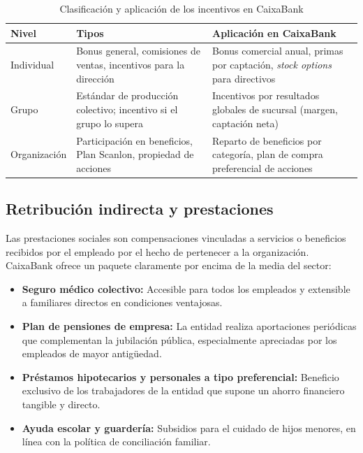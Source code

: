 \begin{table}[H]
\centering
\caption{Clasificación y aplicación de los incentivos en CaixaBank}
\label{tab:incentivos}
\small
\begin{tabularx}{\textwidth}{|l|X|X|}
\hline
\textbf{Nivel} & \textbf{Tipos} & \textbf{Aplicación en CaixaBank} \\
\hline
Individual & Bonus general, comisiones de ventas, incentivos para la dirección & Bonus comercial anual, primas por captación, \textit{stock options} para directivos \\
\hline
Grupo & Estándar de producción colectivo; incentivo si el grupo lo supera & Incentivos por resultados globales de sucursal (margen, captación neta) \\
\hline
Organización & Participación en beneficios, Plan Scanlon, propiedad de acciones & Reparto de beneficios por categoría, plan de compra preferencial de acciones \\
\hline
\end{tabularx}
\end{table}

\subsection{Retribución indirecta y prestaciones}

Las prestaciones sociales son compensaciones vinculadas a servicios o beneficios recibidos por el empleado por el hecho de pertenecer a la organización. CaixaBank ofrece un paquete claramente por encima de la media del sector:

\begin{itemize}
    \item \textbf{Seguro médico colectivo:} Accesible para todos los empleados y extensible a familiares directos en condiciones ventajosas.
    \item \textbf{Plan de pensiones de empresa:} La entidad realiza aportaciones periódicas que complementan la jubilación pública, especialmente apreciadas por los empleados de mayor antigüedad.
    \item \textbf{Préstamos hipotecarios y personales a tipo preferencial:} Beneficio exclusivo de los trabajadores de la entidad que supone un ahorro financiero tangible y directo.
    \item \textbf{Ayuda escolar y guardería:} Subsidios para el cuidado de hijos menores, en línea con la política de conciliación familiar.
\end{itemize}

